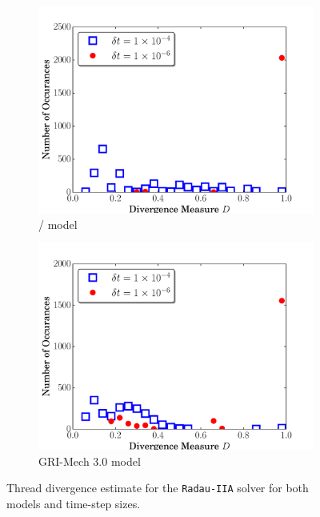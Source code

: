 \documentclass[preprint]{elsarticle}
\begin{document}
\begin{figure}[htb]
  \centering
  \begin{subfigure}{0.49\textwidth}
      \includegraphics[width=\linewidth]{H2_radau2a_div.pdf}
      \caption{\slash{} model}
  \end{subfigure}
  \begin{subfigure}{0.49\textwidth}
      \includegraphics[width=\linewidth]{CH4_radau2a_div.pdf}
      \caption{GRI-Mech 3.0 model}
      \label{F:Rad_div_gri}
  \end{subfigure}
  \caption{Thread divergence estimate for the \texttt{Radau-IIA} solver for both models and time-step sizes.}
  \label{F:rad_divergence}
\end{figure}
\end{document}
